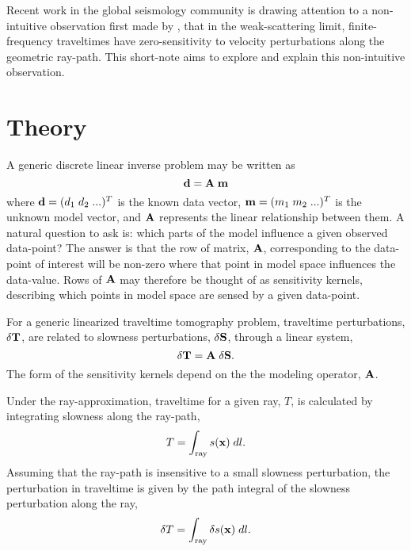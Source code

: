 \par
Recent work in the global seismology community
\cite[]{marquering98,marquering99} is drawing attention to a
non-intuitive observation first made by \cite{woodward92}, that in
the weak-scattering limit, finite-frequency traveltimes have
zero-sensitivity to velocity perturbations along the geometric
ray-path. 
This short-note aims to explore and explain this non-intuitive
observation. 

\section{Theory}
A generic discrete linear inverse problem may be written as
\begin{equation}
{\bf d} = {\bf A \; m}
\end{equation}
where ${\bf d}=(d_1 \; d_2 \;...)^T$ is the known data vector, 
${\bf m}=(m_1 \; m_2 \;...)^T$
is the unknown model vector, and ${\bf A}$ represents the linear
relationship between them.
A natural question to ask is: which parts of the
model influence a given observed data-point?
The answer is that the row of matrix, ${\bf A}$,
corresponding to the data-point of interest will be non-zero
where that point in model space influences the data-value.
Rows of ${\bf A}$ may therefore be thought of as sensitivity kernels,
describing which points in model space are sensed by a given
data-point. 

\par
For a generic linearized traveltime tomography problem, traveltime
perturbations, ${\bf \delta T}$, are related to slowness
perturbations, ${\bf \delta S}$, through a linear system,
\begin{equation}
{\bf \delta T} = {\bf A \; \delta S}.
\end{equation}
The form of the sensitivity kernels depend on the the modeling
operator, ${\bf A}$.

\par
Under the ray-approximation, traveltime for a given ray, $T$, is
calculated by integrating slowness along the ray-path,
\begin{equation}\label{eqn:generictomo}
T=\int_{\rm ray} s({\bf x}) \;dl.
\end{equation}
Assuming that the ray-path is insensitive to a small slowness
perturbation, the perturbation in traveltime is
given by the path integral of the slowness perturbation along the ray, 
\begin{equation}\label{eqn:tomoray}
\delta T=\int_{\rm ray} \delta s({\bf x}) \;dl.
\end{equation}

